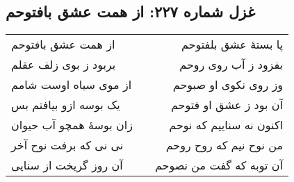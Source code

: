 \begin{center}
\section*{غزل شماره ۲۲۷: از همت عشق بافتوحم}
\label{sec:227}
\begin{longtable}{l p{0.5cm} r}
از همت عشق بافتوحم
&&
پا بستهٔ عشق بلفتوحم
\\
بربود ز بوی زلف عقلم
&&
بفزود ز آب روی روحم
\\
از موی سیاه اوست شامم
&&
وز روی نکوی او صبوحم
\\
یک بوسه ازو بیافتم بس
&&
آن بود ز عشق او فتوحم
\\
زان بوسهٔ همچو آب حیوان
&&
اکنون نه سناییم که نوحم
\\
نی نی که برفت نوح آخر
&&
من نوح نیم که روح روحم
\\
آن روز گریخت از سنایی
&&
آن توبه که گفت من نصوحم
\\
\end{longtable}
\end{center}
